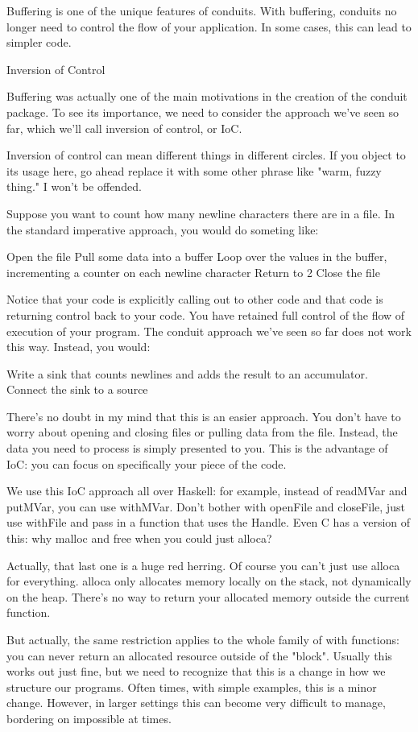 Buffering is one of the unique features of conduits. With buffering, conduits no longer
need to
control the flow of your application. In some cases, this can lead to simpler code.

Inversion of Control

Buffering was actually one of the main motivations in the creation of the
conduit package. To see its importance, we need to consider the approach we've
seen so far, which we'll call inversion of control, or IoC.

Inversion of control can mean different things in different circles. If you object to its
usage here, go ahead replace it with some other phrase like "warm, fuzzy thing." I won't
be
offended.

Suppose you want to count how many newline characters there are in a file. In the standard
imperative approach, you would do someting like:

  
   Open the file
   Pull some data into a buffer
   Loop over the values in the buffer, incrementing a counter on each newline character
   Return to 2
   Close the file
  
Notice that your code is explicitly calling out to other code and that code is returning
control back to your code. You have retained full control of the flow of execution of your
program. The conduit approach we've seen so far does not work this way. Instead, you
would:
  
Write a sink that counts newlines and adds the result to an accumulator.
Connect the sink to a source
  
There's no doubt in my mind that this is an easier approach. You don't have to worry about
opening and closing files or pulling data from the file. Instead, the data you need to
process is
simply presented to you. This is the advantage of IoC: you can focus on specifically your
piece
of the code.

We use this IoC approach all over Haskell: for example, instead of readMVar
and putMVar, you can use withMVar. Don't bother with
openFile and closeFile, just use withFile and
pass in a function that uses the Handle. Even C has a version of this: why
malloc and free when you could just alloca?

Actually, that last one is a huge red herring. Of course you can't just use
alloca for everything. alloca only allocates memory locally on
the stack, not dynamically on the heap. There's no way to return your allocated memory
outside
the current function.

But actually, the same restriction applies to the whole family of with
functions: you can never return an allocated resource outside of the "block". Usually this
works
out just fine, but we need to recognize that this is a change in how we structure our
programs. Often times, with simple examples, this is a minor change. However, in larger
settings
this can become very difficult to manage, bordering on impossible at times.

